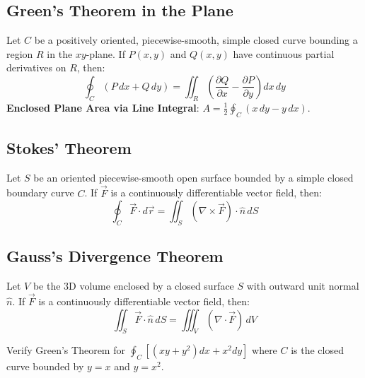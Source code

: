 \subsection{Green's Theorem in the Plane}

\begin{theorem}
Let $C$ be a positively oriented, piecewise-smooth, simple closed curve bounding a region $R$ in the $xy$-plane. If $P(x,y)$ and $Q(x,y)$ have continuous partial derivatives on $R$, then:
\begin{equation}
    \oint_C (P\,dx + Q\,dy) = \iint_R \left( \frac{\partial Q}{\partial x} - \frac{\partial P}{\partial y} \right) dx\,dy
\end{equation}
\textbf{Enclosed Plane Area via Line Integral}: $A = \frac{1}{2}\oint_C (x\,dy - y\,dx)$.
\end{theorem}

\subsection{Stokes' Theorem}

\begin{theorem}
Let $S$ be an oriented piecewise-smooth open surface bounded by a simple closed boundary curve $C$. If $\vec{F}$ is a continuously differentiable vector field, then:
\begin{equation}
    \oint_C \vec{F} \cdot d\vec{r} = \iint_S (\nabla \times \vec{F}) \cdot \hat{n} \, dS
\end{equation}
\end{theorem}

\subsection{Gauss's Divergence Theorem}

\begin{theorem}
Let $V$ be the 3D volume enclosed by a closed surface $S$ with outward unit normal $\hat{n}$. If $\vec{F}$ is a continuously differentiable vector field, then:
\begin{equation}
    \iint_S \vec{F} \cdot \hat{n} \, dS = \iiint_V (\nabla \cdot \vec{F}) \, dV
\end{equation}
\end{theorem}

\begin{example}
Verify Green's Theorem for $\oint_C [(xy + y^2)dx + x^2 dy]$ where $C$ is the closed curve bounded by $y = x$ and $y = x^2$.
\end{example}

